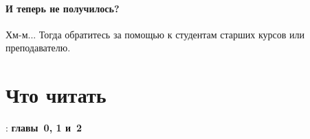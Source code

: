 \paragraph{И теперь не получилось?}
Хм-м... Тогда обратитесь за помощью к студентам старших курсов или преподавателю.



\section{Что читать}
\textcite{Stroustrup:2016:ru}: \textbf{главы~0, 1 и~2}
